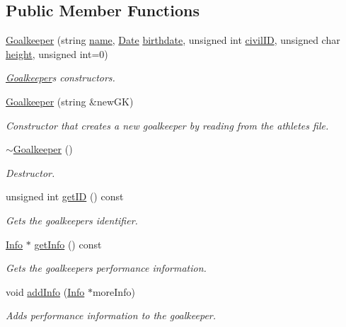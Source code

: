 \subsection*{Public Member Functions}
\begin{DoxyCompactItemize}
\item 
\hyperlink{class_goalkeeper_a41b559a66be23a792b36e7872dedc58e}{Goalkeeper} (string \hyperlink{class_worker_a66cf57341253a31e418cf8abad59ffb1}{name}, \hyperlink{class_date}{Date} \hyperlink{class_worker_a3c1845f40a084b471750a787a87614dd}{birthdate}, unsigned int \hyperlink{class_worker_adfafba55f967994f4595bd914bbba127}{civil\+ID}, unsigned char \hyperlink{class_athlete_a80a64bb1d5c943aaa7ca152d596d9914}{height}, unsigned int=0)
\begin{DoxyCompactList}\small\item\em \hyperlink{class_goalkeeper}{Goalkeeper}\textquotesingle{}s constructors. \end{DoxyCompactList}\item 
\hyperlink{class_goalkeeper_aa5bf0b37a67658a7d8424efda7038a2c}{Goalkeeper} (string \&new\+GK)
\begin{DoxyCompactList}\small\item\em Constructor that creates a new goalkeeper by reading from the athletes file. \end{DoxyCompactList}\item 
\hyperlink{class_goalkeeper_ad06f685ef71e1c5b787088d9a327282a}{$\sim$\+Goalkeeper} ()
\begin{DoxyCompactList}\small\item\em Destructor. \end{DoxyCompactList}\item 
unsigned int \hyperlink{class_goalkeeper_a61cff0476146d2fc063d5ed7be82a123}{get\+ID} () const
\begin{DoxyCompactList}\small\item\em Gets the goalkeeper\textquotesingle{}s identifier. \end{DoxyCompactList}\item 
\hyperlink{class_info}{Info} $\ast$ \hyperlink{class_goalkeeper_a8636c061d81440070cf554d5a3923acb}{get\+Info} () const
\begin{DoxyCompactList}\small\item\em Gets the goalkeeper\textquotesingle{}s performance information. \end{DoxyCompactList}\item 
void \hyperlink{class_goalkeeper_a97fc43118c67d500d7d56abc9c0029fe}{add\+Info} (\hyperlink{class_info}{Info} $\ast$more\+Info)
\begin{DoxyCompactList}\small\item\em Adds performance information to the goalkeeper. \end{DoxyCompactList}\end{DoxyCompactItemize}
